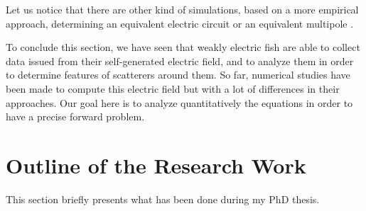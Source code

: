 Let us notice that there are other kind of simulations, based on a
more empirical approach, determining an equivalent electric
circuit \cite{budelli2000electric,caputi1998electric} or an
equivalent multipole \cite{chen2005modeling}.

To conclude this section, we have seen that weakly electric fish are
able to collect data issued from their self-generated electric field,
and to analyze them in order to determine features of scatterers around
them. So far, numerical studies have been made to compute this electric
field but with a lot of differences in their approaches. Our goal
here is to analyze quantitatively the equations in order to have a
precise forward problem.

\section{Outline of the Research Work}

This section briefly presents what has been done during my PhD thesis.